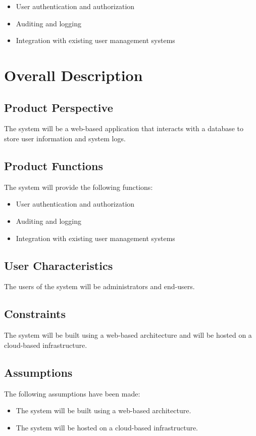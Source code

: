 \documentclass{article}
\begin{document}
\begin{itemize}
 \item User authentication and authorization
 \item Auditing and logging
 \item Integration with existing user management systems
\end{itemize}

\section{Overall Description}
\label{sec:overall-description}

\subsection{Product Perspective}
The system will be a web-based application that interacts with a database to store user information and system logs.

\subsection{Product Functions}
The system will provide the following functions:

\begin{itemize}
 \item User authentication and authorization
 \item Auditing and logging
 \item Integration with existing user management systems
\end{itemize}

\subsection{User Characteristics}
The users of the system will be administrators and end-users.

\subsection{Constraints}
The system will be built using a web-based architecture and will be hosted on a cloud-based infrastructure.

\subsection{Assumptions}
The following assumptions have been made:

\begin{itemize}
 \item The system will be built using a web-based architecture.
 \item The system will be hosted on a cloud-based infrastructure.
\end{itemize}
\end{document}
